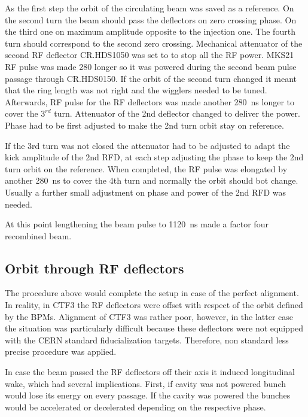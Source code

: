 As the first step the orbit of the circulating beam was saved as a reference.
On the second turn the beam should pass the deflectors on zero crossing phase.
On the third one on maximum amplitude opposite to the injection one. The fourth turn
should correspond to the second zero crossing. 
Mechanical attenuator of the second RF deflector CR.HDS1050 was set to
to stop all the RF power. MKS21 RF pulse was made 280 longer 
so it was powered during the second beam pulse passage through CR.HDS0150.
If the orbit of the second turn changed it meant that the ring length was not right
and the wigglers needed to be tuned. Afterwards, RF pulse for the RF deflectors was made
another 280~ns longer to cover the $3^{rd}$ turn. 
Attenuator of the 2nd deflector changed to deliver the power. 
Phase had to be first adjusted to make the 2nd turn orbit stay on reference.

If the 3rd turn was not closed the attenuator had to be adjusted to adapt the kick amplitude 
of the 2nd RFD, at each step adjusting the phase to keep the 2nd turn orbit on the reference.
When completed, the RF pulse was elongated by another 280~ns to cover the 4th turn
and normally the orbit should bot change. Usually a further small adjustment on phase and 
power of the 2nd RFD was needed. 

At this point lengthening the beam pulse to 1120~ns made a factor four recombined beam.


\subsection{Orbit through RF deflectors}

The procedure above would complete the setup in case of the perfect alignment.
In reality, in CTF3 the RF deflectors were offset with respect of the orbit 
defined by the BPMs. Alignment of CTF3 was rather poor, however, 
in the latter case the situation was particularly 
difficult because these deflectors were not equipped with 
the CERN standard fiducialization targets. 
Therefore, non standard less precise procedure was applied.

In case the beam passed the RF deflectors off their axis it induced longitudinal wake,
which had several implications. First, if cavity was not powered bunch would lose its energy 
on every passage.
If the cavity was powered the bunches would be accelerated or decelerated depending on
the respective phase. 

